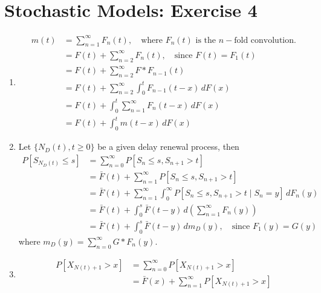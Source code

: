\documentclass[a4paper,10pt]{article}
\theoremstyle{definition}
\begin{document}
\section*{Stochastic Models: Exercise 4}

\begin{enumerate}
\item 
\begin{align*}
m(t) &= \sum_{n=1}^{\infty}F_n(t),\quad \text{where $F_n(t)$ is the $n-$fold convolution.}\\
&=F(t) + \sum_{n=2}^{\infty}F_n(t) ,\quad\text{since $F(t)=F_1(t)$}\\
&=F(t)+\sum_{n=2}^{\infty} F \ast F_{n-1}(t)\\
&=F(t)+\sum_{n=2}^{\infty} \int_{0}^{t} F_{n-1}(t-x)\,dF(x)\\
&=F(t)+\int_{0}^{t} \sum_{n=1}^{\infty} F_{n}(t-x)\,dF(x)\\
&=F(t)+\int_{0}^{t} m(t-x)\,dF(x)
\end{align*}

\item Let $\{N_D(t), t \geq 0\}$ be a given delay renewal process, then
\begin{align*}
P\left[S_{N_D(t)}\leq s\right] &=\sum_{n=0}^{\infty}P\left[S_{n}\leq s, S_{n+1}>t\right]\\
&=\bar{F}(t)+\sum_{n=1}^{\infty}P\left[S_{n}\leq s, S_{n+1}>t\right]\\
&=\bar{F}(t)+\sum_{n=1}^{\infty}\int_{0}^{\infty}P\left[S_{n}\leq s, S_{n+1}>t\mid S_n=y\right]\,dF_n(y)\\
&=\bar{F}(t)+\int_{0}^{s}\bar{F}(t-y)\,d\left(\sum_{n=1}^{\infty}F_n(y)\right)\\
&=\bar{F}(t)+\int_{0}^{s}\bar{F}(t-y)\,dm_D(y),\quad \text{since $F_1(y)=G(y)$}
\end{align*}
where $m_D(y)=\sum_{n=0}^{\infty}G \ast F_{n}(y)$.

\item
\begin{align*}
P\left[X_{N(t)+1}>x\right]&=\sum_{n=0}^{\infty}P\left[X_{N(t)+1}>x\right]\\
&=\bar{F}(x)+\sum_{n=1}^{\infty}P\left[X_{N(t)+1}>x\right]\\
\end{align*}



\end{enumerate}
\end{document}
